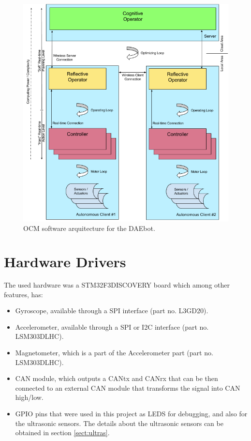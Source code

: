 \documentclass[12pt]{report}%
\begin{document}
\begin{figure}[h!t]
	\centering
	\includegraphics[width=\textwidth]{ocm}
    \caption{OCM software arquitecture for the DAEbot\cite{DAEbot_Wiki}.}
    \label{fig:ocm}
\end{figure}
\clearpage




\chapter{Hardware Drivers}
The used hardware was a STM32F3DISCOVERY board which among other features, has:
\begin{itemize}
\item Gyroscope, available through a SPI interface (part no. L3GD20).
\item Accelerometer, available through a SPI or I2C interface (part no. LSM303DLHC).
\item Magnetometer, which is a part of the Accelerometer part (part no. LSM303DLHC).
\item CAN module, which outputs a CANtx and CANrx that can be then connected to an external CAN module that transforms the signal into CAN high/low.
\item GPIO pins that were used in this project as LEDS for debugging, and also for the ultrasonic sensors. The details about the ultrasonic sensors can be obtained in section \ref{sect:ultras}.
\end{itemize}
\end{document}
